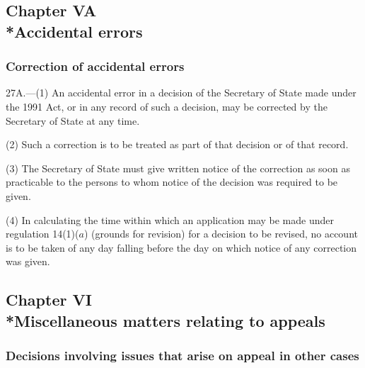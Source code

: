 \documentclass[12pt,a4paper]{article}
\begin{document}
\subsection[Chapter VA --- Accidental errors]{Chapter VA\\*Accidental errors}

\subsubsection[27A. Correction of accidental errors]{Correction of accidental errors}

27A.—(1) An accidental error in a decision of the Secretary of State made under the 1991 Act, or in any record of such a decision, may be corrected by the Secretary of State at any time.

(2) Such a correction is to be treated as part of that decision or of that record.

(3) The Secretary of State must give written notice of the correction as soon as practicable to the persons to whom notice of the decision was required to be given.

(4) In calculating the time within which an application may be made under regulation 14(1)($a$)  (grounds for revision) for a decision to be revised, no account is to be taken of any day falling before the day on which notice of any correction was given.


\subsection[Chapter VI --- Miscellaneous matters relating to appeals]{Chapter VI\\*Miscellaneous matters relating to appeals}

\renewcommand\parthead{--- Part III Chapter VI}

\subsubsection[28. Decisions involving issues that arise on appeal in other cases]{Decisions involving issues that arise on appeal in other cases}
\end{document}

